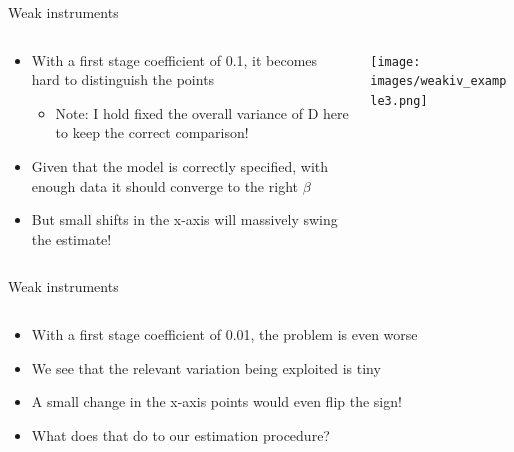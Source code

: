 \documentclass[notes,11pt, aspectratio=169]{beamer}
\begin{document}
\begin{frame}{Weak instruments}
  \begin{columns}[T] %
    \begin{column}{0.5\textwidth}
  \begin{itemize}
  \item With a first stage coefficient of 0.1, it becomes hard to distinguish the points
    \begin{itemize}
    \item Note: I hold fixed the overall variance of D here to keep
      the correct comparison!
    \end{itemize}
  \item Given that the model is correctly specified, with enough data it should converge to the right $\beta$
  \item But small shifts in the x-axis will massively swing the
    estimate!
  \end{itemize}
\end{column}
\begin{column}{0.5\textwidth}
  \texttt{[image: images/weakiv\_example3.png]}
\end{column}
\end{columns}
\end{frame}

\begin{frame}{Weak instruments}
  \begin{columns}[T] %
    \begin{column}{0.5\textwidth}
  \begin{itemize}
  \item With a first stage coefficient of 0.01, the problem is even worse
  \item<2-> We see that the relevant variation being exploited is tiny
  \item<2-> A small change in the x-axis points would even flip the sign!
  \item<2-> What does that do to our estimation procedure?
  \end{itemize}
\end{column}
\begin{column}{0.5\textwidth}
\end{column}
\end{columns}
\end{frame}
\end{document}
